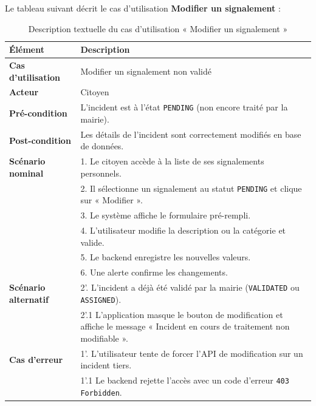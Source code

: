 Le tableau suivant décrit le cas d'utilisation \textbf{\og Modifier un signalement \fg{}} :

\begin{table}[H]
    \centering
    \caption{Description textuelle du cas d'utilisation « Modifier un signalement »}
    \label{tab:txt_mod_offre}
    \vspace{0.2cm}
    \small
    \begin{tabularx}{\textwidth}{|l|X|}
        \hline
        \textbf{Élément} & \textbf{Description} \\ \hline
        \textbf{Cas d’utilisation} & Modifier un signalement non validé \\ \hline
        \textbf{Acteur} & Citoyen \\ \hline
        \textbf{Pré-condition} & L'incident est à l'état \texttt{PENDING} (non encore traité par la mairie). \\ \hline
        \textbf{Post-condition} & Les détails de l'incident sont correctement modifiés en base de données. \\ \hline
        \textbf{Scénario nominal} &
        1. Le citoyen accède à la liste de ses signalements personnels.\\
        & 2. Il sélectionne un signalement au statut \texttt{PENDING} et clique sur « Modifier ».\\
        & 3. Le système affiche le formulaire pré-rempli.\\
        & 4. L'utilisateur modifie la description ou la catégorie et valide.\\
        & 5. Le backend enregistre les nouvelles valeurs.\\
        & 6. Une alerte confirme les changements. \\ \hline
        \textbf{Scénario alternatif} &
        2'. L'incident a déjà été validé par la mairie (\texttt{VALIDATED} ou \texttt{ASSIGNED}).\\
        & 2'.1 L'application masque le bouton de modification et affiche le message « Incident en cours de traitement non modifiable ». \\ \hline
        \textbf{Cas d’erreur} &
        1'. L'utilisateur tente de forcer l'API de modification sur un incident tiers.\\
        & 1'.1 Le backend rejette l'accès avec un code d'erreur \texttt{403 Forbidden}. \\ \hline
    \end{tabularx}
\end{table}

